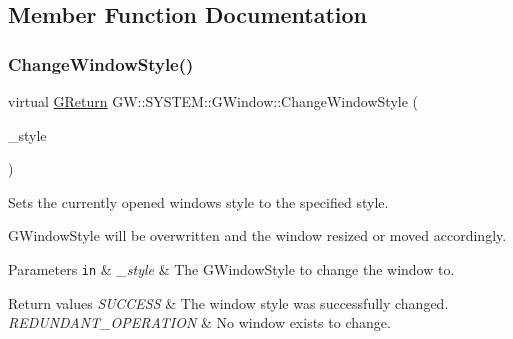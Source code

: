 \subsection{Member Function Documentation}
\mbox{\label{class_g_w_1_1_s_y_s_t_e_m_1_1_g_window_a21533c58e920d347c377ebdaa6d2b76f}} 
\subsubsection{\texorpdfstring{Change\+Window\+Style()}{ChangeWindowStyle()}}
{\footnotesize\ttfamily virtual \mbox{\hyperlink{namespace_g_w_a67a839e3df7ea8a5c5686613a7a3de21}{G\+Return}} G\+W\+::\+S\+Y\+S\+T\+E\+M\+::\+G\+Window\+::\+Change\+Window\+Style (\begin{DoxyParamCaption}\item[{\mbox{\hyperlink{namespace_g_w_1_1_s_y_s_t_e_m_ad117891e556631f842625c348d36a071}{G\+Window\+Style}}}]{\+\_\+style }\end{DoxyParamCaption})\hspace{0.3cm}{\ttfamily [pure virtual]}}



Sets the currently opened window\textquotesingle{}s style to the specified style. 

G\+Window\+Style will be overwritten and the window resized or moved accordingly.


\begin{DoxyParams}[1]{Parameters}
\mbox{\tt in}  & {\em \+\_\+style} & The G\+Window\+Style to change the window to.\\
\hline
\end{DoxyParams}

\begin{DoxyRetVals}{Return values}
{\em S\+U\+C\+C\+E\+SS} & The window style was successfully changed. \\
\hline
{\em R\+E\+D\+U\+N\+D\+A\+N\+T\+\_\+\+O\+P\+E\+R\+A\+T\+I\+ON} & No window exists to change. \\
\hline
\end{DoxyRetVals}
\mbox{\label{class_g_w_1_1_s_y_s_t_e_m_1_1_g_window_aca175a29d6e87e4d4ed848325216c8f1}} 
